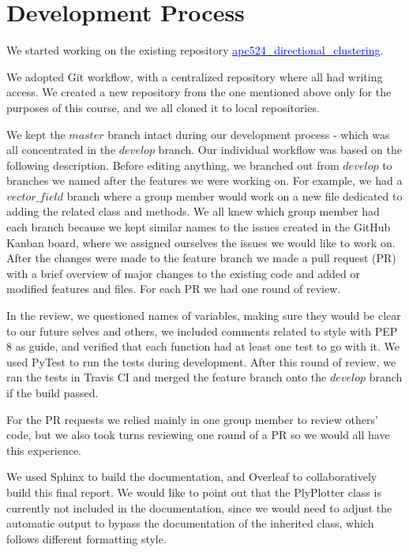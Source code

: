 \documentclass[11pt]{article}
\begin{document}
\section{Development Process}
\label{section:development}

We started working on the existing repository  \href{https://github.com/arpastrana/apc524_directional_clustering}{\textcolor{blue}{apc524\_directional\_clustering}}.

We adopted Git workflow, with a centralized repository where all had writing access. We created a new repository from the one mentioned above only for the purposes of this course, and we all cloned it to local repositories. 

We kept the $master$ branch intact during our development process - which was all concentrated in the $develop$ branch. Our individual workflow was based on the following description. Before editing anything, we branched out from $develop$ to branches we named after the features we were working on. For example, we had a $vector\_field$ branch where a group member would work on a new file dedicated to adding the related class and methods. We all knew which group member had each branch because we kept similar names to the issues created in the GitHub Kanban board, where we assigned ourselves the issues we would like to work on. 
After the changes were made to the feature branch we made a pull request (PR) with a brief overview of major changes to the existing code and added or modified features and files. For each PR we had one round of review.

In the review, we questioned names of variables, making sure they would be clear to our future selves and others, we included comments related to style with PEP 8 as guide, and verified that each function had at least one test to go with it. We used PyTest to run the tests during development. After this round of review, we ran the tests in Travis CI and merged the feature branch onto the $develop$ branch if the build passed.

For the PR requests we relied mainly in one group member to review others' code, but we also took turns reviewing one round of a PR so we would all have this experience. 

We used Sphinx to build the documentation, and Overleaf to collaboratively build this final report. We would like to point out that the PlyPlotter class is currently not included in the documentation, since we would need to adjust the automatic output to bypass the documentation of the inherited class, which follows different formatting style.
\end{document}
